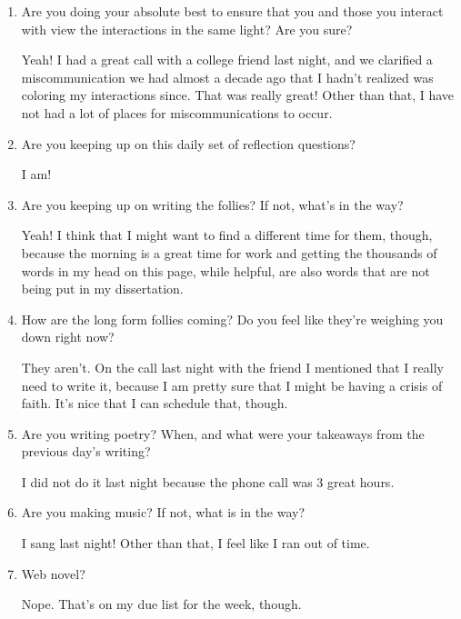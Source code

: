 \documentclass[12pt]{article}
\renewcommand{\,}{\textsuperscript{,}}
\begin{document}
\begin{enumerate}
\item Are you doing your absolute best to ensure that you and those you interact with view the interactions in the same light? Are you sure?

Yeah! I had a great call with a college friend last night, and we clarified a miscommunication we had almost a decade ago that I hadn't realized was coloring my interactions since.  
That was really great!  
Other than that, I have not had a lot of places for miscommunications to occur.

\item Are you keeping up on this daily set of reflection questions?

I am!

\item Are you keeping up on writing the follies? If not, what's in the way?

Yeah! I think that I might want to find a different time for them, though, because the morning is a great time for work and getting the thousands of words in my head on this page, while helpful, are also words that are not being put in my dissertation.

\item How are the long form follies coming? Do you feel like they're weighing you down right now?

They aren't. On the call last night with the friend I mentioned that I really need to write it, because I am pretty sure that I might be having a crisis of faith.  
It's nice that I can schedule that, though.

\item Are you writing poetry? When, and what were your takeaways from the previous day's writing?

I did not do it last night because the phone call was 3 great hours.

\item Are you making music? If not, what is in the way?

I sang last night! Other than that, I feel like I ran out of time.

\item Web novel?

Nope. That's on my due list for the week, though.

\end{enumerate}
\end{document}
